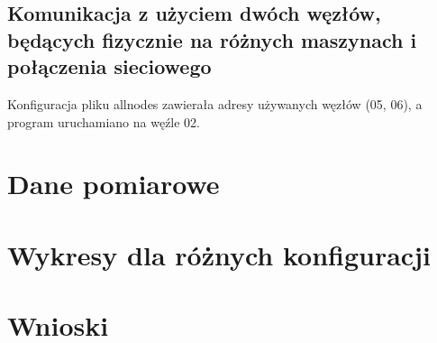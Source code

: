 \documentclass[10pt,english, openany]{book}
\begin{document}
\section{Komunikacja z użyciem dwóch węzłów, będących fizycznie na różnych maszynach i połączenia sieciowego}
Konfiguracja pliku allnodes zawierała adresy używanych węzłów (05, 06), a program uruchamiano na węźle 02.


\chapter{Dane pomiarowe}

\chapter{Wykresy dla różnych konfiguracji}

\chapter{Wnioski}\
\end{document}
